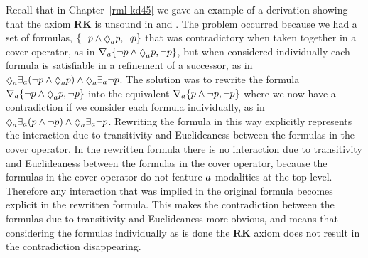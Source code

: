 Recall that in Chapter~\ref{rml-kd45} we gave an example of a derivation showing that the axiom {\bf RK} is unsound in \logicRmlKFF{} and \logicRmlKD{}.
The problem occurred because we had a set of formulas, $\{\lnot \atomP \land \possibleA \atomP, \lnot \atomP\}$ that was contradictory when taken together in a cover operator, as in $\coverA \{\lnot \atomP \land \possibleA \atomP, \lnot \atomP\}$, but when considered individually each formula is satisfiable in a refinement of a successor, as in $\possibleA \somerefsA (\lnot \atomP \land \possibleA \atomP) \land \possibleA \somerefsA \lnot \atomP$.
The solution was to rewrite the formula $\coversA \{\lnot \atomP \land \possibleA \atomP, \lnot \atomP\}$ into the equivalent $\nabla_{a} \{p \land \lnot p, \lnot p\}$ where we now have a contradiction if we consider each formula individually, as in $\possibleA \somerefsA (\atomP \land \lnot \atomP) \land \possibleA \somerefsA \lnot \atomP$.
Rewriting the formula in this way explicitly represents the interaction due to transitivity and Euclideaness between the formulas in the cover operator.
In the rewritten formula there is no interaction due to transitivity and Euclideaness between the formulas in the cover operator, because the formulas in the cover operator do not feature $a$-modalities at the top level.
Therefore any interaction that was implied in the original formula becomes explicit in the rewritten formula.
This makes the contradiction between the formulas due to transitivity and Euclideaness more obvious, and means that considering the formulas individually as is done the {\bf RK} axiom does not result in the contradiction disappearing.

